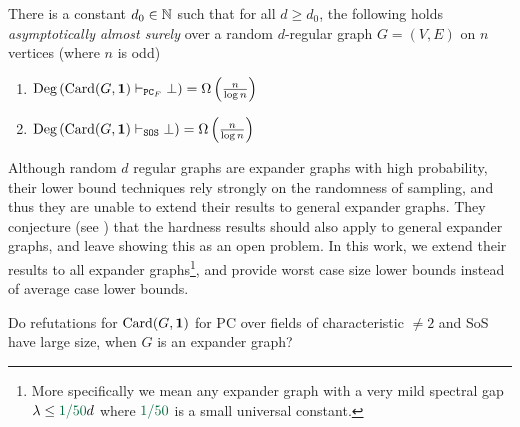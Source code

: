 \documentclass[11pt]{article}
\begin{document}
\begin{theorem}\label{thm:prev-thm}
There is a constant $d_0 \in \mathbb{N}$ such that for all $d \geq d_0$, the following holds \emph{asymptotically almost surely} over a random $d$-regular graph $G=(V,E)$ on $n$ vertices (where $n$ is odd)
\begin{enumerate}
    \item{ $\text{Deg}\left(\text{Card}(G, \mathbf{1}) \vdash_{\texttt{PC}_F} \bot\right) = \Omega\left(\frac{n}{\log n}\right)$} 
    \item{$\text{Deg}\left(\text{Card}(G, \mathbf{1}) \vdash_{\texttt{SOS}} \bot\right) = \Omega\left(\frac{n}{\log n}\right)$}
\end{enumerate}
\end{theorem}

Although random $d$ regular graphs are expander graphs with high probability, their lower bound techniques rely strongly on the randomness of sampling, and thus they are unable to extend their results to general expander graphs.
They conjecture (see \citep[Section 6]{Austrin_2022}) that the hardness results should also apply to general expander graphs, and leave showing this as an open problem. In this work, we extend their results to all expander graphs\footnote{More specifically we mean any expander graph with a very mild spectral gap $\lambda \leq \epsilonL d$ where $\epsilonL$ is a small universal constant.}, and provide worst case size lower bounds instead of average case lower bounds.

\begin{problem}

Do refutations for $\text{Card}(G, \mathbf{1})$ for
PC over fields of characteristic $\neq 2$ and SoS have large size, when $G$ is an expander graph?

\end{problem}
\end{document}
